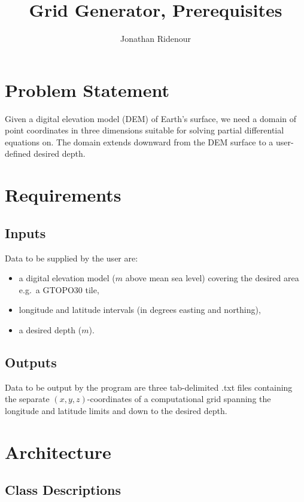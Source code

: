 \documentclass{article}
\title{Grid Generator, Prerequisites\\
}
\author{Jonathan Ridenour}
\begin{document}
\maketitle

\section{Problem Statement}
Given a digital elevation model (DEM) of Earth's surface, we need a domain of point coordinates in three dimensions suitable for solving partial differential equations on. The domain extends downward from the DEM surface to a user-defined desired depth.

\section{Requirements}

\subsection{Inputs}
Data to be supplied by the user are: 
\begin{itemize}
\item a digital elevation model ($m$ above mean sea level) covering the desired area e.g.\ a GTOPO30 tile, 
\item longitude and latitude intervals (in degrees easting and northing),
\item a desired depth ($m$).
\end{itemize}

\subsection{Outputs}
Data to be output by the program are three tab-delimited .txt files containing the separate $(x, y, z)$-coordinates of a computational grid spanning the longitude and latitude limits and down to the desired depth.

\section{Architecture}

\subsection{Class Descriptions}
\end{document}
